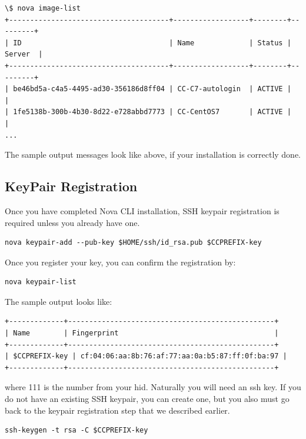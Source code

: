 \begin{lstlisting}
\$ nova image-list
+--------------------------------------+------------------+--------+---------+
| ID                                   | Name             | Status | Server  |
+--------------------------------------+------------------+--------+---------+
| be46bd5a-c4a5-4495-ad30-356186d8ff04 | CC-C7-autologin  | ACTIVE |         |
| 1fe5138b-300b-4b30-8d22-e728abbd7773 | CC-CentOS7       | ACTIVE |         |
...
\end{lstlisting}

The sample output messages look like above, if your installation is correctly
done.

\subsection{KeyPair Registration}

Once you have completed Nova CLI installation, SSH keypair registration is
required unless you already have one.

\begin{lstlisting}
nova keypair-add --pub-key $HOME/ssh/id_rsa.pub $CCPREFIX-key
\end{lstlisting}

Once you register your key, you can confirm the registration by:

\begin{lstlisting}
nova keypair-list
\end{lstlisting}

The sample output looks like:

\begin{lstlisting}
+-------------+-------------------------------------------------+
| Name        | Fingerprint                                     |
+-------------+-------------------------------------------------+
| $CCPREFIX-key | cf:04:06:aa:8b:76:af:77:aa:0a:b5:87:ff:0f:ba:97 |
+-------------+-------------------------------------------------+
\end{lstlisting}

where 111 is the number from your hid.  Naturally you will need an ssh
key.  If you do not have an existing SSH keypair, you can create one,
but you also must go back to the keypair registration step that we
described earlier.

\begin{lstlisting}
ssh-keygen -t rsa -C $CCPREFIX-key
\end{lstlisting}


